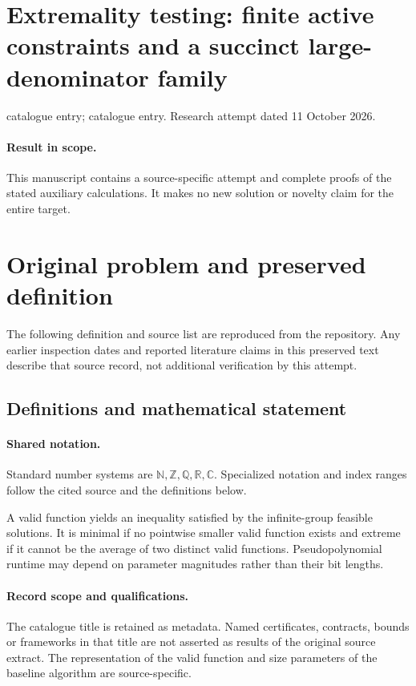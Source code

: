 \documentclass[11pt]{article}
\begin{document}
\section*{Extremality testing: finite active constraints and a succinct large-denominator family}
\noindent catalogue entry; catalogue entry. Research attempt dated 11 October 2026.
\paragraph{Result in scope.}This manuscript contains a source-specific attempt and complete proofs of the stated auxiliary calculations. It makes no new solution or novelty claim for the entire target.
\section{Original problem and preserved definition}
The following definition and source list are reproduced from the repository. Any earlier inspection dates and reported literature claims in this preserved text describe that source record, not additional verification by this attempt.
\subsection{Definitions and mathematical statement}

\paragraph{Shared notation.}Standard number systems are $\mathbb N,\mathbb Z,\mathbb Q,\mathbb R,\mathbb C$. Specialized notation and index ranges follow the cited source and the definitions below.


A valid function yields an inequality satisfied by the infinite-group feasible solutions. It is minimal if no pointwise smaller valid function exists and extreme if it cannot be the average of two distinct valid functions. Pseudopolynomial runtime may depend on parameter magnitudes rather than their bit lengths.
\paragraph{Record scope and qualifications.}
The catalogue title is retained as metadata. Named certificates, contracts, bounds or frameworks in that title are not asserted as results of the original source extract.
The representation of the valid function and size parameters of the baseline algorithm are source-specific.
\end{document}
